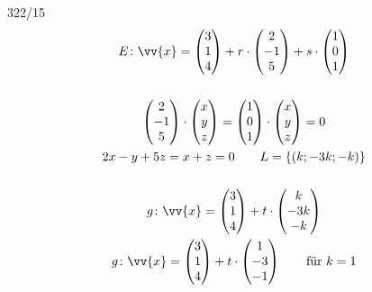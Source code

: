 \begin{exercise}{322/15}
  \begin{gather*}
    E \colon \vv{x} = \begin{pmatrix}3 \\ 1 \\ 4\end{pmatrix} + r \cdot \begin{pmatrix}2 \\ -1 \\ 5\end{pmatrix} + s \cdot \begin{pmatrix}1 \\ 0 \\ 1\end{pmatrix} \\\\
    \begin{pmatrix}2 \\ -1 \\ 5\end{pmatrix} \cdot \begin{pmatrix}x \\ y \\ z\end{pmatrix} = \begin{pmatrix}1 \\ 0 \\ 1\end{pmatrix} \cdot \begin{pmatrix}x \\ y \\ z\end{pmatrix} = 0 \\
    2x - y + 5z = x + z = 0 \qquad L = \{(k;-3k;-k)\} \\\\
    g \colon \vv{x} = \begin{pmatrix}3 \\ 1 \\ 4\end{pmatrix} + t \cdot \begin{pmatrix}k \\ -3k \\ -k\end{pmatrix} \\
    g \colon \vv{x} = \begin{pmatrix}3 \\ 1 \\ 4\end{pmatrix} + t \cdot \begin{pmatrix}1 \\ -3 \\ -1\end{pmatrix} \qquad \text{für $k = 1$}
  \end{gather*}
\end{exercise}
